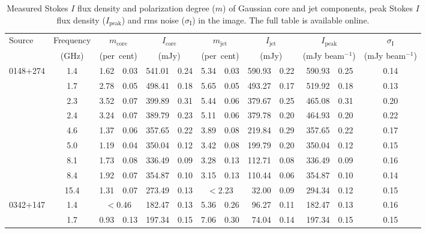 \documentclass[a4paper,fleqn,usenatbib,useAMS]{mnras}
\begin{document}
\begin{table*}
\begin{minipage}{175mm}
\caption{Measured Stokes $I$ flux density and polarization degree ($m$) of Gaussian core and jet components, peak Stokes $I$ flux density ($I_\mathrm{peak}$) and rms noise ($\sigma_\mathrm{I}$) in the image. The full table is available online. \label{frac_p1}}
\begin{center}
\begin{tabular}{@{}lcr@{$\pm$}lr@{$\pm$}lr@{$\pm$}lr@{$\pm$}lr@{$\pm$}lc@{}}
\hline
Source&Frequency&\multicolumn{2}{c}{$m_\mathrm{core}$}&\multicolumn{2}{c}{$I_\mathrm{core}$}&\multicolumn{2}{c}{$m_\mathrm
{jet}$}&\multicolumn{2}{c}{$I_\mathrm{jet}$}&\multicolumn{2}{c}{$I_\mathrm{peak}$}&$\sigma_\mathrm{I}$\\
&(GHz)&\multicolumn{2}{c}{(per~cent)}&\multicolumn{2}{c}{(mJy)}&\multicolumn{2}{c}{(per~cent)}&\multicolumn{2}{c}{(mJy)}&\multicolumn{
2}{c}{(mJy beam$^{-1}$)}&(mJy beam$^{-1}$)\\
\hline
0148$+$274
 & 1.4 & 1.62 & 0.03 & 541.01 & 0.24 & 5.34 & 0.03 & 590.93 & 0.22 & 590.93 & 0.25 & 0.14\\
 & 1.7 & 2.78 & 0.05 & 498.41 & 0.18 & 5.65 & 0.05 & 493.27 & 0.17 & 519.92 & 0.18 & 0.13\\
 & 2.3 & 3.52 & 0.07 & 399.89 & 0.31 & 5.44 & 0.06 & 379.67 & 0.25 & 465.08 & 0.31 & 0.20\\
 & 2.4 & 3.24 & 0.07 & 389.79 & 0.23 & 5.11 & 0.06 & 379.78 & 0.20 & 464.93 & 0.20 & 0.22\\
 & 4.6 & 1.37 & 0.06 & 357.65 & 0.22 & 3.89 & 0.08 & 219.84 & 0.29 & 357.65 & 0.22 & 0.17\\
 & 5.0 & 1.19 & 0.04 & 350.04 & 0.12 & 3.42 & 0.08 & 199.79 & 0.20 & 350.04 & 0.12 & 0.15\\
 & 8.1 & 1.73 & 0.08 & 336.49 & 0.09 & 3.28 & 0.13 & 112.71 & 0.08 & 336.49 & 0.09 & 0.16\\
 & 8.4 & 1.92 & 0.07 & 354.87 & 0.10 & 3.15 & 0.13 & 110.44 & 0.06 & 354.87 & 0.10 & 0.14\\
 & 15.4 & 1.31 & 0.07 & 273.49 & 0.13 & \multicolumn{2}{c}{$<$2.23} & 32.00 & 0.09 & 294.34 & 0.12 & 0.15\\
0342$+$147
 & 1.4 & \multicolumn{2}{c}{$<$0.46} & 182.47 & 0.13 & 5.36 & 0.26 & 96.27 & 0.11 & 182.47 & 0.13 & 0.16\\
 & 1.7 & 0.93 & 0.13 & 197.34 & 0.15 & 7.06 & 0.30 & 74.04 & 0.14 & 197.34 & 0.15 & 0.15\\

\end{tabular}
\end{center}
\end{minipage}
\end{table*}
\end{document}
